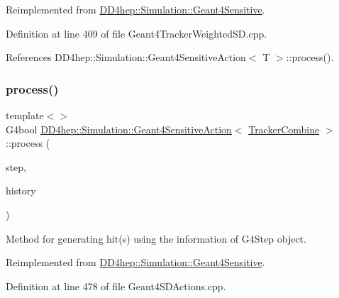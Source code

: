 Reimplemented from \hyperlink{class_d_d4hep_1_1_simulation_1_1_geant4_sensitive_a9a9463a6c29a66dad43a52ffc9f7838d}{D\+D4hep\+::\+Simulation\+::\+Geant4\+Sensitive}.



Definition at line 409 of file Geant4\+Tracker\+Weighted\+S\+D.\+cpp.



References D\+D4hep\+::\+Simulation\+::\+Geant4\+Sensitive\+Action$<$ T $>$\+::process().

\hypertarget{class_d_d4hep_1_1_simulation_1_1_geant4_sensitive_action_a0788632157d0928128a95e0cead244db}{}\label{class_d_d4hep_1_1_simulation_1_1_geant4_sensitive_action_a0788632157d0928128a95e0cead244db} 
\subsubsection{\texorpdfstring{process()}{process()}\hspace{0.1cm}{\footnotesize\ttfamily [6/7]}}
{\footnotesize\ttfamily template$<$$>$ \\
G4bool \hyperlink{class_d_d4hep_1_1_simulation_1_1_geant4_sensitive_action}{D\+D4hep\+::\+Simulation\+::\+Geant4\+Sensitive\+Action}$<$ \hyperlink{struct_d_d4hep_1_1_simulation_1_1_tracker_combine}{Tracker\+Combine} $>$\+::process (\begin{DoxyParamCaption}\item[{G4\+Step $\ast$}]{step,  }\item[{G4\+Touchable\+History $\ast$}]{history }\end{DoxyParamCaption})\hspace{0.3cm}{\ttfamily [virtual]}}



Method for generating hit(s) using the information of G4\+Step object. 



Reimplemented from \hyperlink{class_d_d4hep_1_1_simulation_1_1_geant4_sensitive_a9a9463a6c29a66dad43a52ffc9f7838d}{D\+D4hep\+::\+Simulation\+::\+Geant4\+Sensitive}.



Definition at line 478 of file Geant4\+S\+D\+Actions.\+cpp.



